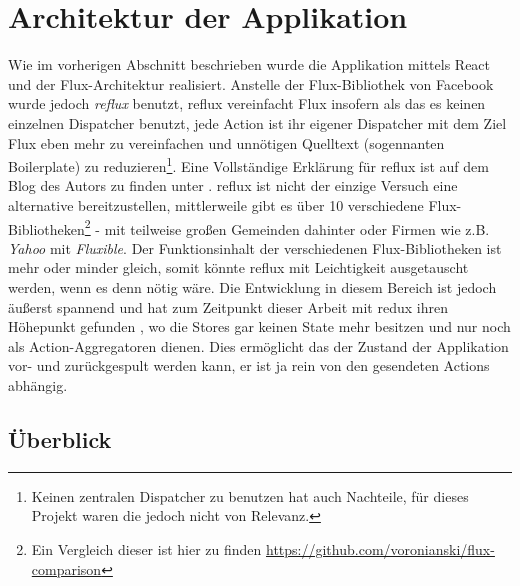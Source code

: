 \documentclass[12pt,twoside]{book}
\begin{document}
\section{Architektur der Applikation}

Wie im vorherigen Abschnitt beschrieben wurde die Applikation mittels React und der Flux-Architektur realisiert. Anstelle der Flux-Bibliothek von Facebook wurde jedoch \textit{reflux} benutzt, reflux vereinfacht Flux insofern als das es keinen einzelnen Dispatcher benutzt, jede Action ist ihr eigener Dispatcher mit dem Ziel Flux eben mehr zu vereinfachen und unnötigen Quelltext (sogennanten Boilerplate) zu reduzieren\footnote{Keinen zentralen Dispatcher zu benutzen hat auch Nachteile, für dieses Projekt waren die jedoch nicht von Relevanz.}. Eine Vollständige Erklärung für reflux ist auf dem Blog des Autors zu finden unter \cite{reflux}. reflux ist nicht der einzige Versuch eine alternative bereitzustellen, mittlerweile gibt es über 10 verschiedene Flux-Bibliotheken\footnote{Ein Vergleich dieser ist hier zu finden \url{https://github.com/voronianski/flux-comparison}} - mit teilweise großen Gemeinden dahinter oder Firmen wie z.B. \textit{Yahoo} mit \textit{Fluxible}. Der Funktionsinhalt der verschiedenen Flux-Bibliotheken ist mehr oder minder gleich, somit könnte reflux mit Leichtigkeit ausgetauscht werden, wenn es denn nötig wäre.
Die Entwicklung in diesem Bereich ist jedoch äußerst spannend und hat zum Zeitpunkt dieser Arbeit mit redux ihren Höhepunkt gefunden \citep{redux}, wo die Stores gar keinen State mehr besitzen und nur noch als Action-Aggregatoren dienen. Dies ermöglicht das der Zustand der Applikation vor- und zurückgespult werden kann, er ist ja rein von den gesendeten Actions abhängig.

\subsection{Überblick}
\end{document}
